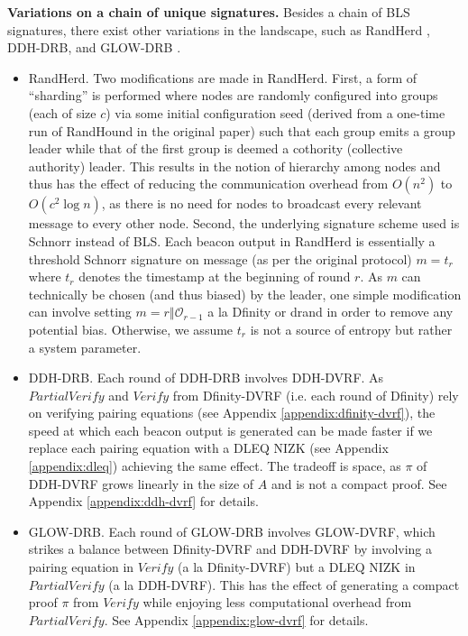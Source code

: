 \documentclass[letterpaper,twocolumn,10pt]{article}
\theoremstyle{definition}
\theoremstyle{remark}
\begin{document}
\noindent\textbf{Variations on a chain of unique signatures.} Besides a chain of BLS signatures, there exist other variations in the landscape, such as RandHerd \cite{syta2017scalable}, DDH-DRB, and GLOW-DRB \cite{galindo2020fully}.
\begin{itemize}
\item RandHerd. Two modifications are made in RandHerd. First, a form of ``sharding'' is performed where nodes are randomly configured into groups (each of size $c$) via some initial configuration seed (derived from a one-time run of RandHound in the original paper) such that each group emits a group leader while that of the first group is deemed a cothority (collective authority) leader. This results in the notion of hierarchy among nodes and thus has the effect of reducing the communication overhead from $O(n^2)$ to $O(c^2 \log n)$, as there is no need for nodes to broadcast every relevant message to every other node. Second, the underlying signature scheme used is Schnorr instead of BLS. Each beacon output in RandHerd is essentially a threshold Schnorr signature on message (as per the original protocol) $m = t_r$ where $t_r$ denotes the timestamp at the beginning of round $r$. As $m$ can technically be chosen (and thus biased) by the leader, one simple modification can involve setting $m = r \mathbin\Vert \mathcal{O}_{r - 1}$ a la Dfinity or drand in order to remove any potential bias. Otherwise, we assume $t_r$ is not a source of entropy but rather a system parameter.
\item DDH-DRB. Each round of DDH-DRB involves DDH-DVRF. As $PartialVerify$ and $Verify$ from Dfinity-DVRF (i.e. each round of Dfinity) rely on verifying pairing equations (see Appendix \ref{appendix:dfinity-dvrf}), the speed at which each beacon output is generated can be made faster if we replace each pairing equation with a DLEQ NIZK (see Appendix \ref{appendix:dleq}) achieving the same effect. The tradeoff is space, as $\pi$ of DDH-DVRF grows linearly in the size of $A$ and is not a compact proof. See Appendix \ref{appendix:ddh-dvrf} for details.
\item GLOW-DRB. Each round of GLOW-DRB involves GLOW-DVRF, which strikes a balance between Dfinity-DVRF and DDH-DVRF by involving a pairing equation in $Verify$ (a la Dfinity-DVRF) but a DLEQ NIZK in $PartialVerify$ (a la DDH-DVRF). This has the effect of generating a compact proof $\pi$ from $Verify$ while enjoying less computational overhead from $PartialVerify$. See Appendix \ref{appendix:glow-dvrf} for details.
\end{itemize}
\end{document}
